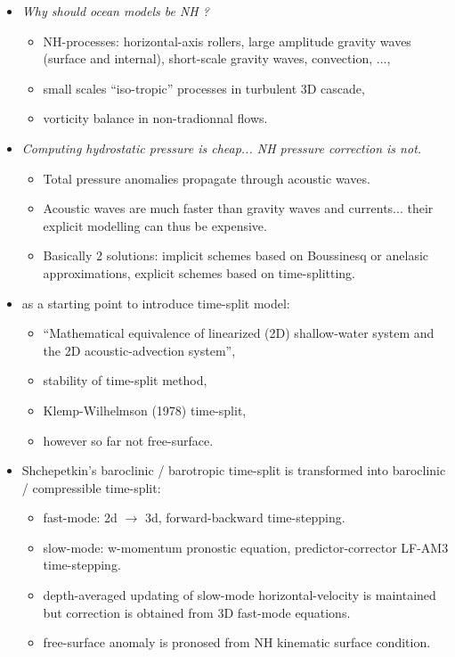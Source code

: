 \documentclass[a4paper]{article}
\numberwithin{equation}{section}
\begin{document}
\begin{itemize}
 \item \textit{Why should ocean models be NH ?}
 \begin{itemize}[label=\textbullet,font=\tiny]
  \item NH-processes: horizontal-axis rollers, large amplitude gravity waves (surface and internal),
  short-scale gravity waves, convection, ...,
  \item small scales ``iso-tropic'' processes in turbulent 3D cascade,
  \item vorticity balance in non-tradionnal flows.
 \end{itemize}
 \item \textit{Computing hydrostatic pressure is cheap... NH pressure correction is not.}
 \begin{itemize}[label=\textbullet,font=\tiny]
  \item Total pressure anomalies propagate through acoustic waves.
  \item Acoustic waves are much faster than gravity waves and currents... their explicit modelling can thus be expensive.
  \item Basically 2 solutions: implicit schemes based on Boussinesq or anelasic approximations, explicit schemes based on time-splitting.
 \end{itemize}
 \item \href{run:./Skamarock\_Time\_Splitting\_Divergence\_MWR_1992.pdf}
 {\cite{skamarock_MWR_1992}} as a starting point to introduce time-split model: 
 \begin{itemize}[label=\textbullet,font=\tiny]
  \item ``Mathematical equivalence of linearized (2D) shallow-water system and the 2D acoustic-advection system'',
  \item stability of time-split method,
  \item Klemp-Wilhelmson (1978) time-split,
  \item however so far not free-surface.
 \end{itemize}
 \item Shchepetkin's baroclinic / barotropic time-split is transformed into baroclinic / compressible time-split:
 \begin{itemize}[label=\textbullet,font=\tiny]
  \item fast-mode: 2d $\rightarrow$ 3d, forward-backward time-stepping.
  \item slow-mode: w-momentum pronostic equation, predictor-corrector LF-AM3 time-stepping.
  \item depth-averaged updating of slow-mode horizontal-velocity is maintained but correction is obtained from 3D fast-mode equations.
  \item free-surface anomaly is pronosed from NH kinematic surface condition.
 \end{itemize}
\end{itemize}
\end{document}
